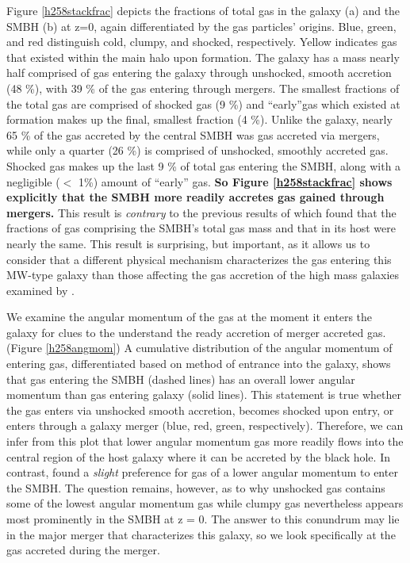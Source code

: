 \documentclass[manuscript]{aastex}
\begin{document}
Figure \ref{h258stackfrac} depicts the fractions of total gas in the galaxy (a) and the SMBH (b) at z=0, again differentiated by the gas particles' origins. Blue, green, and red distinguish cold, clumpy, and shocked, respectively. Yellow indicates gas that existed within the main halo upon formation. The galaxy has a mass nearly half comprised of gas entering the galaxy through unshocked, smooth accretion (48 \%), with 39 \% of the gas entering through mergers. The smallest fractions of the total gas are comprised of shocked gas (9 \%) and ``early''gas which existed at formation makes up the final, smallest fraction (4 \%). Unlike the galaxy, nearly 65 \% of the gas accreted by the central SMBH was gas accreted via mergers, while only a quarter (26 \%) is comprised of unshocked, smoothly accreted gas. Shocked gas makes up the last 9 \% of total gas entering the SMBH, along with a negligible ($<$ 1\%) amount of ``early'' gas. \textbf{So Figure \ref{h258stackfrac} shows explicitly that the SMBH more readily accretes gas gained through mergers.} This result is \textit{contrary} to the previous results of \cite{Bellovary2013} which found that the fractions of gas comprising the SMBH's total gas mass and that in its host were nearly the same. This result is surprising, but important, as it allows us to consider that a different physical mechanism characterizes the gas entering this MW-type galaxy than those affecting the gas accretion of the high mass galaxies examined by \cite{Bellovary2013}. 

We examine the angular momentum of the gas at the moment it enters the galaxy for clues to the understand the ready accretion of merger accreted gas. (Figure \ref{h258angmom}) A cumulative distribution of the angular momentum of entering gas, differentiated based on method of entrance into the galaxy, shows that gas entering the SMBH (dashed lines) has an overall lower angular momentum than gas entering galaxy (solid lines). This statement is true whether the gas enters via unshocked smooth accretion, becomes shocked upon entry, or enters through a galaxy merger (blue, red, green, respectively). Therefore, we can infer from this plot that lower angular momentum gas more readily flows into the central region of the host galaxy where it can be accreted by the black hole. In contrast, \cite{Bellovary2013} found a \textit{slight} preference for gas of a lower angular momentum to enter the SMBH. The question remains, however, as to why unshocked gas contains some of the lowest angular momentum gas while clumpy gas nevertheless appears most prominently in the SMBH at z = 0. The answer to this conundrum may lie in the major merger that characterizes this galaxy, so we look specifically at the gas accreted during the merger. 
\end{document}
